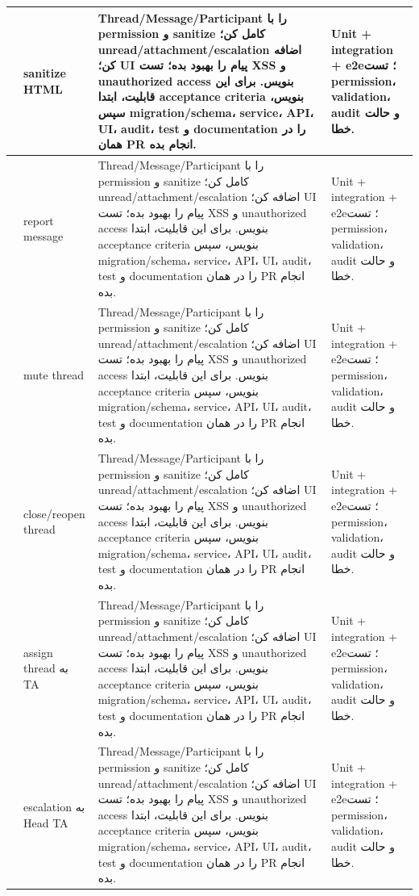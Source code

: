 \documentclass[11pt,a4paper]{article}
\begin{document}
\begin{longtable}{|>{\raggedleft\arraybackslash}p{}|>{\raggedleft\arraybackslash}p{}|>{\raggedleft\arraybackslash}p{}|>{\raggedleft\arraybackslash}p{}|}
150 & sanitize HTML & Thread/Message/Participant را با permission و sanitize کامل کن؛ unread/attachment/escalation اضافه کن؛ UI پیام را بهبود بده؛ تست XSS و unauthorized access بنویس. برای این قابلیت، ابتدا acceptance criteria بنویس، سپس migration/schema، service، API، UI، audit، test و documentation را در همان PR انجام بده. & Unit + integration + e2e؛ تست permission، validation، audit و حالت خطا. \\ \hline
151 & report message & Thread/Message/Participant را با permission و sanitize کامل کن؛ unread/attachment/escalation اضافه کن؛ UI پیام را بهبود بده؛ تست XSS و unauthorized access بنویس. برای این قابلیت، ابتدا acceptance criteria بنویس، سپس migration/schema، service، API، UI، audit، test و documentation را در همان PR انجام بده. & Unit + integration + e2e؛ تست permission، validation، audit و حالت خطا. \\ \hline
152 & mute thread & Thread/Message/Participant را با permission و sanitize کامل کن؛ unread/attachment/escalation اضافه کن؛ UI پیام را بهبود بده؛ تست XSS و unauthorized access بنویس. برای این قابلیت، ابتدا acceptance criteria بنویس، سپس migration/schema، service، API، UI، audit، test و documentation را در همان PR انجام بده. & Unit + integration + e2e؛ تست permission، validation، audit و حالت خطا. \\ \hline
153 & close/reopen thread & Thread/Message/Participant را با permission و sanitize کامل کن؛ unread/attachment/escalation اضافه کن؛ UI پیام را بهبود بده؛ تست XSS و unauthorized access بنویس. برای این قابلیت، ابتدا acceptance criteria بنویس، سپس migration/schema، service، API، UI، audit، test و documentation را در همان PR انجام بده. & Unit + integration + e2e؛ تست permission، validation، audit و حالت خطا. \\ \hline
154 & assign thread به TA & Thread/Message/Participant را با permission و sanitize کامل کن؛ unread/attachment/escalation اضافه کن؛ UI پیام را بهبود بده؛ تست XSS و unauthorized access بنویس. برای این قابلیت، ابتدا acceptance criteria بنویس، سپس migration/schema، service، API، UI، audit، test و documentation را در همان PR انجام بده. & Unit + integration + e2e؛ تست permission، validation، audit و حالت خطا. \\ \hline
155 & escalation به Head TA & Thread/Message/Participant را با permission و sanitize کامل کن؛ unread/attachment/escalation اضافه کن؛ UI پیام را بهبود بده؛ تست XSS و unauthorized access بنویس. برای این قابلیت، ابتدا acceptance criteria بنویس، سپس migration/schema، service، API، UI، audit، test و documentation را در همان PR انجام بده. & Unit + integration + e2e؛ تست permission، validation، audit و حالت خطا. \\ \hline

\end{longtable}
\end{document}
